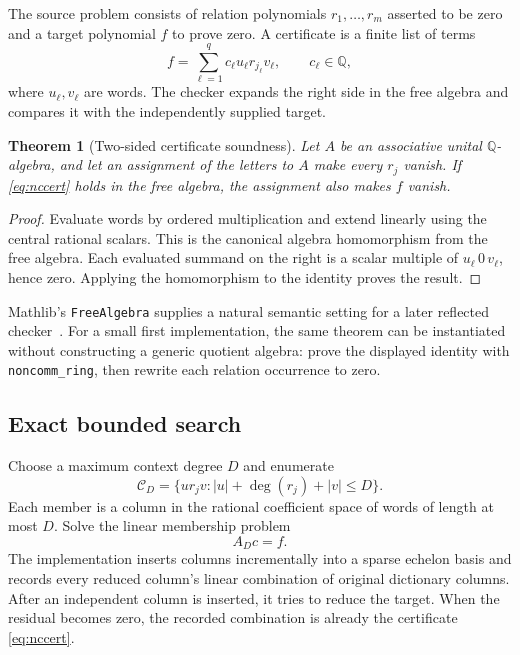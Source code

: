 \documentclass[11pt,letterpaper]{article}
\newcommand{\Q}{\mathbb Q}\newcommand{\R}{\mathbb R}\newcommand{\N}{\mathbb N}
\newcommand{\code}[1]{\texttt{#1}}
\newtheorem{theorem}{Theorem}[section]
\theoremstyle{definition}\newtheorem{definition}[theorem]{Definition}
\theoremstyle{remark}\newtheorem{remark}[theorem]{Remark}
\begin{document}
The source problem consists of relation polynomials $r_1,\ldots,r_m$ asserted
to be zero and a target polynomial $f$ to prove zero. A certificate is a finite
list of terms
\begin{equation}
 f=\sum_{\ell=1}^q c_\ell u_\ell r_{j_\ell}v_\ell,
 \qquad c_\ell\in\Q,
 \label{eq:nccert}
\end{equation}
where $u_\ell,v_\ell$ are words. The checker expands the right side in the free
algebra and compares it with the independently supplied target.

\begin{theorem}[Two-sided certificate soundness]
\label{thm:nc}
Let $A$ be an associative unital $\Q$-algebra, and let an assignment of the
letters to $A$ make every $r_j$ vanish. If \eqref{eq:nccert} holds in the free
algebra, the assignment also makes $f$ vanish.
\end{theorem}
\begin{proof}
Evaluate words by ordered multiplication and extend linearly using the central
rational scalars. This is the canonical algebra homomorphism from the free
algebra. Each evaluated summand on the right is a scalar multiple of
$u_\ell\,0\,v_\ell$, hence zero. Applying the homomorphism to the identity
proves the result.
\end{proof}

Mathlib's \code{FreeAlgebra} supplies a natural semantic setting for a later
reflected checker~\cite{free-algebra}. For a small first implementation, the
same theorem can be instantiated without constructing a generic quotient
algebra: prove the displayed identity with \code{noncomm\_ring}, then rewrite
each relation occurrence to zero.

\subsection{Exact bounded search}
Choose a maximum context degree $D$ and enumerate
\begin{equation}
 \mathcal C_D=
 \{u r_j v: |u|+\deg(r_j)+|v|\le D\}.
 \label{eq:ncdictionary}
\end{equation}
Each member is a column in the rational coefficient space of words of length
at most $D$. Solve the linear membership problem
\[
 A_D c=f.
\]
The implementation inserts columns incrementally into a sparse echelon basis
and records every reduced column's linear combination of original dictionary
columns. After an independent column is inserted, it tries to reduce the target.
When the residual becomes zero, the recorded combination is already the
certificate \eqref{eq:nccert}.
\end{document}
